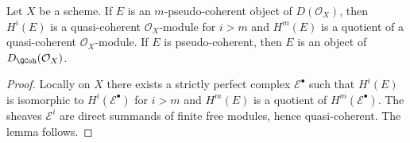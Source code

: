 \begin{lemma}
\label{lemma-pseudo-coherent}
Let $X$ be a scheme. If $E$ is an $m$-pseudo-coherent
object of $D(\mathcal{O}_X)$, then $H^i(E)$ is a quasi-coherent
$\mathcal{O}_X$-module for $i > m$ and $H^m(E)$ is a quotient
of a quasi-coherent $\mathcal{O}_X$-module.
If $E$ is pseudo-coherent, then $E$ is an object of
$D_\QCoh(\mathcal{O}_X)$.
\end{lemma}

\begin{proof}
Locally on $X$ there exists a strictly perfect complex $\mathcal{E}^\bullet$
such that $H^i(E)$ is isomorphic to $H^i(\mathcal{E}^\bullet)$ for $i > m$
and $H^m(E)$ is a quotient of $H^m(\mathcal{E}^\bullet)$. The sheaves
$\mathcal{E}^i$ are direct summands of finite free modules,
hence quasi-coherent. The lemma follows.
\end{proof}
